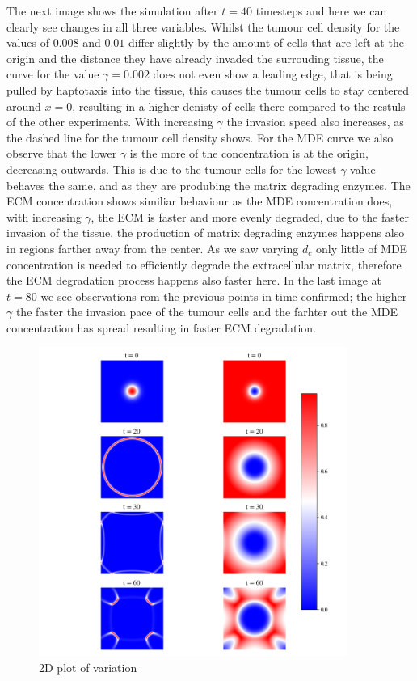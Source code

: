 The next image shows the simulation after $t=40$ timesteps and here we can clearly see changes in all three variables. 
Whilst the tumour cell density for the values of $0.008$ and $0.01$ differ slightly by the amount of cells that are left at the origin and the distance they have already invaded the surrouding tissue, the curve for the value $\gamma=0.002$ does not even show a leading edge, that is being pulled by haptotaxis into the tissue, this causes the tumour cells to stay centered around $x=0$, resulting in a higher denisty of cells there compared to the restuls of the other experiments. With increasing $\gamma$ the invasion speed also increases, as the dashed line for the tumour cell density shows. 
For the MDE curve we also observe that the lower $\gamma$ is the more of the concentration is at the origin, decreasing outwards. This is due to the tumour cells for the lowest $\gamma$ value behaves the same, and as they are produbing the matrix degrading enzymes. The ECM concentration shows similiar behaviour as the MDE concentration does, with increasing $\gamma$, the ECM is faster and more evenly degraded, due to the faster invasion of the tissue, the production of matrix degrading enzymes happens also in regions farther away from the center. As we saw varying $d_c$ only little of MDE concentration is needed to efficiently degrade the extracellular matrix, therefore the ECM degradation process happens also faster here.\newline
In the last image at $t=80$ we see observations rom the previous points in time confirmed; the higher $\gamma$ the faster the invasion pace of the tumour cells and the farhter out the MDE concentration has spread resulting in faster ECM degradation.\newline 
\begin{figure}[h]
    \centering
    \includegraphics[width=0.9\textwidth]{resources/images/2D_plot.png}
    \caption{2D plot of variation}
    \label{fig:gamma_2D_plot}
\end{figure}
